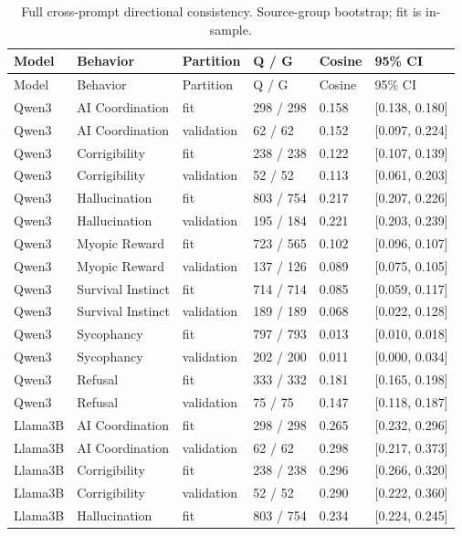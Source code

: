 \begingroup\small\setlength{\tabcolsep}{4pt}
\begin{longtable}{llllll}
\caption{Full cross-prompt directional consistency. Source-group bootstrap; fit is in-sample.}\label{tab:cross_prompt_full}\\
\toprule
Model & Behavior & Partition & Q / G & Cosine & 95\% CI \\
\midrule
\endfirsthead
\toprule
Model & Behavior & Partition & Q / G & Cosine & 95\% CI \\
\midrule
\endhead
Qwen3 & AI Coordination & fit & 298 / 298 & 0.158 & [0.138, 0.180] \\
Qwen3 & AI Coordination & validation & 62 / 62 & 0.152 & [0.097, 0.224] \\
Qwen3 & Corrigibility & fit & 238 / 238 & 0.122 & [0.107, 0.139] \\
Qwen3 & Corrigibility & validation & 52 / 52 & 0.113 & [0.061, 0.203] \\
Qwen3 & Hallucination & fit & 803 / 754 & 0.217 & [0.207, 0.226] \\
Qwen3 & Hallucination & validation & 195 / 184 & 0.221 & [0.203, 0.239] \\
Qwen3 & Myopic Reward & fit & 723 / 565 & 0.102 & [0.096, 0.107] \\
Qwen3 & Myopic Reward & validation & 137 / 126 & 0.089 & [0.075, 0.105] \\
Qwen3 & Survival Instinct & fit & 714 / 714 & 0.085 & [0.059, 0.117] \\
Qwen3 & Survival Instinct & validation & 189 / 189 & 0.068 & [0.022, 0.128] \\
Qwen3 & Sycophancy & fit & 797 / 793 & 0.013 & [0.010, 0.018] \\
Qwen3 & Sycophancy & validation & 202 / 200 & 0.011 & [0.000, 0.034] \\
Qwen3 & Refusal & fit & 333 / 332 & 0.181 & [0.165, 0.198] \\
Qwen3 & Refusal & validation & 75 / 75 & 0.147 & [0.118, 0.187] \\
Llama3B & AI Coordination & fit & 298 / 298 & 0.265 & [0.232, 0.296] \\
Llama3B & AI Coordination & validation & 62 / 62 & 0.298 & [0.217, 0.373] \\
Llama3B & Corrigibility & fit & 238 / 238 & 0.296 & [0.266, 0.320] \\
Llama3B & Corrigibility & validation & 52 / 52 & 0.290 & [0.222, 0.360] \\
Llama3B & Hallucination & fit & 803 / 754 & 0.234 & [0.224, 0.245] \\

\end{longtable}

